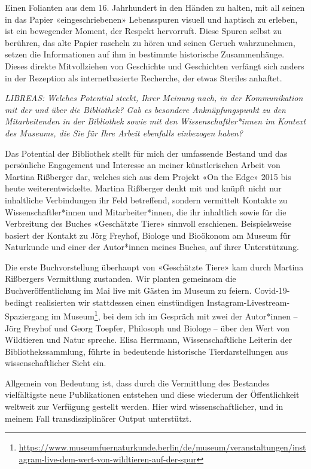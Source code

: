 \documentclass[a4paper,
fontsize=11pt,
oneside,
numbers=noperiodatend,
parskip=half-,
bibliography=totoc,
final
]{scrartcl}
\begin{document}
Einen Folianten aus dem 16. Jahrhundert in den Händen zu halten, mit all
seinen in das Papier «eingeschriebenen» Lebensspuren visuell und
haptisch zu erleben, ist ein bewegender Moment, der Respekt hervorruft.
Diese Spuren selbst zu berühren, das alte Papier rascheln zu hören und
seinen Geruch wahrzunehmen, setzen die Informationen auf ihm in
bestimmte historische Zusammenhänge. Dieses direkte Mitvollziehen von
Geschichte und Geschichten verfängt sich anders in der Rezeption als
internetbasierte Recherche, der etwas Steriles anhaftet.

\emph{LIBREAS: Welches Potential steckt, Ihrer Meinung nach, in der
Kommunikation mit der und über die Bibliothek? Gab es besondere
Anknüpfungspunkt zu den Mitarbeitenden in der Bibliothek sowie mit den
Wissenschaftler*innen im Kontext des Museums, die Sie für Ihre Arbeit
ebenfalls einbezogen haben?}

Das Potential der Bibliothek stellt für mich der umfassende Bestand und
das persönliche Engagement und Interesse an meiner künstlerischen Arbeit
von Martina Rißberger dar, welches sich aus dem Projekt «On the Edge»
2015 bis heute weiterentwickelte. Martina Rißberger denkt mit und knüpft
nicht nur inhaltliche Verbindungen ihr Feld betreffend, sondern
vermittelt Kontakte zu Wissenschaftler*innen und Mitarbeiter*innen, die
ihr inhaltlich sowie für die Verbreitung des Buches «Geschätzte Tiere»
sinnvoll erschienen. Beispielsweise basiert der Kontakt zu Jörg Freyhof,
Biologe und Bioökonom am Museum für Naturkunde und einer der Autor*innen
meines Buches, auf ihrer Unterstützung.

Die erste Buchvorstellung überhaupt von «Geschätzte Tiere» kam durch
Martina Rißbergers Vermittlung zustanden. Wir planten gemeinsam die
Buchveröffentlichung im Mai live mit Gästen im Museum zu feiern.
Covid-19-bedingt realisierten wir stattdessen einen einstündigen
Instagram-Livestream-Spaziergang im Museum\footnote{\url{https://www.museumfuernaturkunde.berlin/de/museum/veranstaltungen/instagram-live-dem-wert-von-wildtieren-auf-der-spur}},
bei dem ich im Gespräch mit zwei der Autor*innen -- Jörg Freyhof und
Georg Toepfer, Philosoph und Biologe -- über den Wert von Wildtieren und
Natur spreche. Elisa Herrmann, Wissenschaftliche Leiterin der
Bibliothekssammlung, führte in bedeutende historische Tierdarstellungen
aus wissenschaftlicher Sicht ein.

Allgemein von Bedeutung ist, dass durch die Vermittlung des Bestandes
vielfältigste neue Publikationen entstehen und diese wiederum der
Öffentlichkeit weltweit zur Verfügung gestellt werden. Hier wird
wissenschaftlicher, und in meinem Fall transdisziplinärer Output
unterstützt.
\end{document}
